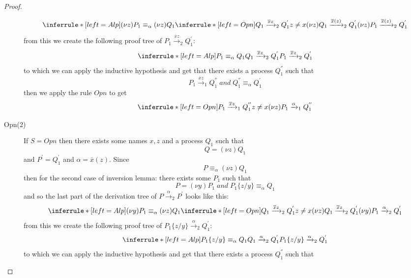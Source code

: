 \begin{theorem}
\begin{proof}
\begin{description}
		\[
		  \inferrule* [left=Alp]{
		      (\nu z)P_{1}\equiv_{\alpha}(\nu z)Q_{1}
		    \\
		      \inferrule* [left=Opn]{
			  Q_{1}\xrightarrow{\overline{x}z}_{2}Q_{1}^{'}
			\\
			  z\neq x
		      }{
			(\nu z)Q_{1}\xrightarrow{\overline{x}(z)}_{2}Q_{1}^{'}
		      }
		  }{
		    (\nu z)P_{1}\xrightarrow{\overline{x}(z)}_{2}Q_{1}^{'}
		  }
		\]
		from this we create the following proof tree of $P_{1}\xrightarrow{\overline{x}z}_{2}Q_{1}^{'}$:
		\[
		  \inferrule* [left=Alp]{
		      P_{1}\equiv_{\alpha}Q_{1}
		    \\
		      Q_{1}\xrightarrow{\overline{x}z}_{2}Q_{1}^{'}
		  }{
		    P_{1}\xrightarrow{\overline{x}z}_{2}Q_{1}^{'}
		  }		
		\]
		to which we can apply the inductive hypothesis and get that there exists a process $Q_{1}^{''}$ such that
		\[
		  P_{1}\xrightarrow{\overline{x}z}_{1}Q_{1}^{''}\;and\; Q_{1}^{''}\equiv_{\alpha}Q_{1}^{'}
		\]
		then we apply the rule $Opn$ to get
		\[
		      \inferrule* [left=Opn]{
			  P_{1}\xrightarrow{\overline{x}z}_{1}Q_{1}^{''}
			\\
			  z\neq x
		      }{
			(\nu z)P_{1}\xrightarrow{\alpha}_{1}Q_{1}^{''}
		      }		 
		\]
	  \item[Opn(2)]
	    If $S=Opn$ then there exists some names $x,z$ and a process $Q_{1}$ such that 
	    \[
	      Q=(\nu z)Q_{1}
	    \]
	    and $P^{'}=Q_{1}^{'}$ and $\alpha=\overline{x}(z)$. Since 
	    \[
	      P\equiv_{\alpha}(\nu z)Q_{1}
	    \]
	    then for the second case of inversion lemma:
		there exists some $P_{1}$ such that 
		\[
		  P=(\nu y)P_{1}\; and\; P_{1}\{z/y\}\equiv_{\alpha}Q_{1}
		\]
		and so the last part of the derivation tree of $P\xrightarrow{\alpha}_{2}P^{'}$ looks like this:
		\[
		  \inferrule* [left=Alp]{
		      (\nu y)P_{1}\equiv_{\alpha}(\nu z)Q_{1}
		    \\
		      \inferrule* [left=Opn]{
			  Q_{1}\xrightarrow{\overline{x}z}_{2}Q_{1}^{'}
			\\
			  z\neq x
		      }{
			(\nu z)Q_{1}\xrightarrow{\overline{x}z}_{2}Q_{1}^{'}
		      }
		  }{
		    (\nu y)P_{1}\xrightarrow{\alpha}_{2}Q_{1}^{'}
		  }
		\]
		from this we create the following proof tree of $P_{1}\{z/y\}\xrightarrow{\alpha}_{2}Q_{1}^{'}$:
		\[
		  \inferrule* [left=Alp]{
		      P_{1}\{z/y\}\equiv_{\alpha}Q_{1}
		    \\
		      Q_{1}\xrightarrow{\alpha}_{2}Q_{1}^{'}
		  }{
		    P_{1}\{z/y\}\xrightarrow{\alpha}_{2}Q_{1}^{'}
		  }		
		\]
		to which we can apply the inductive hypothesis and get that there exists a process $Q_{1}^{''}$ such that

\end{description}
\end{proof}
\end{theorem}
